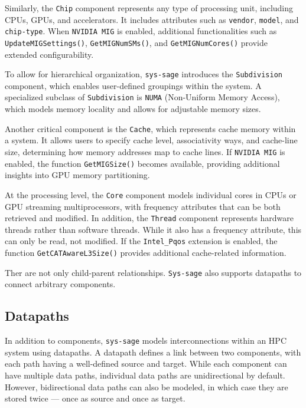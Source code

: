 Similarly, the \texttt{Chip} component represents any type of processing unit, including CPUs, GPUs, and accelerators. It includes attributes such as \texttt{vendor}, \texttt{model}, and \texttt{chip-type}. When \texttt{NVIDIA MIG} is enabled, additional functionalities such as \texttt{UpdateMIGSettings()}, \texttt{GetMIGNumSMs()}, and \texttt{GetMIGNumCores()} provide extended configurability. \cite[see Chip]{sys-sage-docu}

To allow for hierarchical organization, \texttt{sys-sage} introduces the \texttt{Subdivision} component, which enables user-defined groupings within the system. A specialized subclass of \texttt{Subdivision} is \texttt{NUMA} (Non-Uniform Memory Access), which models memory locality and allows for adjustable memory sizes. \cite[see Subdivision, NUMA]{sys-sage-docu}  

Another critical component is the \texttt{Cache}, which represents cache memory within a system. It allows users to specify cache level, associativity ways, and cache-line size, determining how memory addresses map to cache lines. If \texttt{NVIDIA MIG} is enabled, the function \texttt{GetMIGSize()} becomes available, providing additional insights into GPU memory partitioning. \cite[see Cache]{sys-sage-docu}

At the processing level, the \texttt{Core} component models individual cores in CPUs or GPU streaming multiprocessors, with frequency attributes that can be both retrieved and modified. In addition, the \texttt{Thread} component represents hardware threads rather than software threads. While it also has a frequency attribute, this can only be read, not modified. If the \texttt{Intel\_Pqos} extension is enabled, the function \texttt{GetCATAwareL3Size()} provides additional cache-related information. \cite[see Core, Thread]{sys-sage-docu}

Ther are not only child-parent relationships. \texttt{Sys-sage} also supports datapaths to connect arbitrary components.

\subsection{Datapaths}

In addition to components, \texttt{sys-sage} models interconnections within an \ac{HPC} system using datapaths. A datapath defines a link between two components, with each path having a well-defined source and target. While each component can have multiple data paths, individual data paths are unidirectional by default. However, bidirectional data paths can also be modeled, in which case they are stored twice — once as source and once as target. \cite[see Data Path]{sys-sage-docu}

